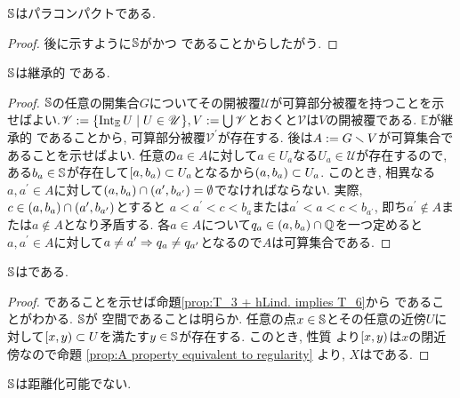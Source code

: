 \documentclass[uplatex, dvipdfmx, a4paper, 12pt, class=jsbook, crop=false]{standalone}
\begin{document}
\begin{property}
	$ \mathbb{S} $はパラコンパクトである.
\end{property}

\begin{proof}
	後に示すように$ \mathbb{S} $がかつ \Lindelof であることからしたがう.
\end{proof}

\begin{property}
	$ \mathbb{S} $は継承的 \Lindelof である.
\end{property}

\begin{proof}
	$ \mathbb{S} $の任意の開集合$ G $についてその開被覆$ \mathscr{U} $が可算部分被覆を持つことを示せばよい.$ \mathscr{V} \defeq \setcomp{\topint_\mathbb{E}{U}}{U \in \mathscr{U}}, V \defeq \bigcup \mathscr{V} $とおくと$ \mathscr{V} $は$ V $の開被覆である. $ \mathbb{E} $が継承的 \Lindelof であることから, 可算部分被覆$ \mathscr{V}^{\prime} $が存在する. 後は$ A \mathrel{:=} G \smallsetminus V $が可算集合であることを示せばよい. 任意の$ a \in A $に対して$ a \in U_a$なる$ U_a \in \mathscr{U} $が存在するので, ある$ b_a \in \mathbb{S} $が存在して$ \left[ a , b_a \right) \subset U_a$となるから$ \left( a , b_a \right) \subset U_a $. このとき, 相異なる$ a, a^{\prime} \in A$に対して$ \left( a , b_a \right) \cap \left( a^{\prime} , b_{a^{\prime}} \right) = \emptyset $でなければならない. 実際, $ c \in \left( a , b_a \right) \cap \left( a^{\prime} , b_{a^{\prime}} \right) $とすると
	$ a < a^\prime < c < b_a $または$ a^\prime < a < c < b_{a^\prime} $, 即ち$ a^\prime \notin A $または$ a \notin A $となり矛盾する. 各$ a \in A $について$ q_a \in \left( a , b_a \right) \cap \mathbb{Q} $を一つ定めると$ a, a^\prime \in A $に対して$ a \neq a^\prime \Rightarrow q_a \neq q_{a^\prime} $となるので$ A $は可算集合である.
\end{proof}

\begin{property}
	$ \mathbb{S} $はである.
\end{property}

\begin{proof}
	 であることを示せば命題\ref{prop:T_3 + hLind. implies T_6}から  であることがわかる. $ \mathbb{S} $が  空間であることは明らか. 任意の点$ x \in \mathbb{S} $とその任意の近傍$ U $に対して$ \left[ x , y \right) \subset U $を満たす$ y \in \mathbb{S} $が存在する. このとき, 性質  より$ \left[ x , y \right) $は$ x $の閉近傍なので命題 \ref{prop:A property equivalent to regularity} より, $ X $はである.
\end{proof}

\begin{property}
	$ \mathbb{S} $は距離化可能でない.
\end{property}
\end{document}
